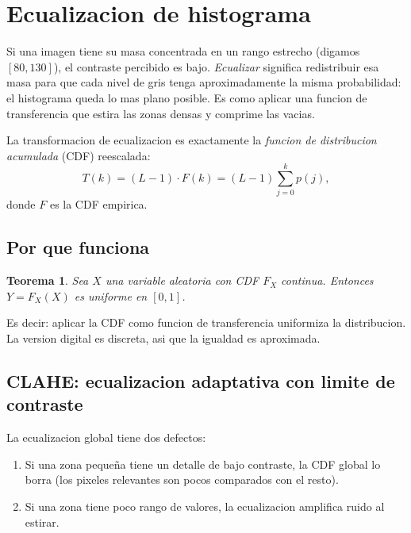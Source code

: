 \documentclass[11pt,a4paper,twoside,openright]{book}
\newtheorem{teorema}[definicion]{Teorema}
\begin{document}
\section{Ecualizacion de histograma}

\begin{intuibox}
Si una imagen tiene su masa concentrada en un rango estrecho (digamos $[80, 130]$), el contraste percibido es bajo. \emph{Ecualizar} significa redistribuir esa masa para que cada nivel de gris tenga aproximadamente la misma probabilidad: el histograma queda lo mas plano posible. Es como aplicar una funcion de transferencia que estira las zonas densas y comprime las vacias.
\end{intuibox}

La transformacion de ecualizacion es exactamente la \emph{funcion de distribucion acumulada} (CDF) reescalada:
\begin{equation}
T(k) = (L-1) \cdot F(k) = (L-1) \sum_{j=0}^{k} p(j),
\label{eq:eq-hist}
\end{equation}
donde $F$ es la CDF empirica.

\subsection{Por que funciona}

\begin{teorema}
Sea $X$ una variable aleatoria con CDF $F_X$ continua. Entonces $Y = F_X(X)$ es uniforme en $[0,1]$.
\end{teorema}

Es decir: aplicar la CDF como funcion de transferencia uniformiza la distribucion. La version digital es discreta, asi que la igualdad es aproximada.

\subsection{CLAHE: ecualizacion adaptativa con limite de contraste}

La ecualizacion global tiene dos defectos:

\begin{enumerate}[leftmargin=2em]
  \item Si una zona pequeña tiene un detalle de bajo contraste, la CDF global lo borra (los pixeles relevantes son pocos comparados con el resto).
  \item Si una zona tiene poco rango de valores, la ecualizacion amplifica ruido al estirar.
\end{enumerate}
\end{document}
